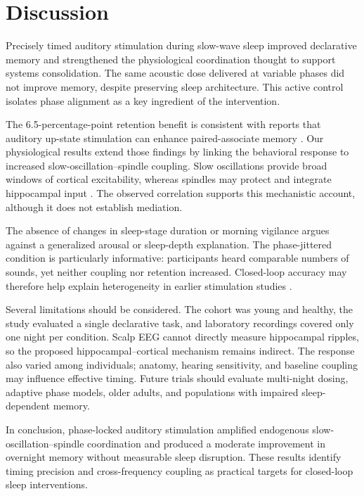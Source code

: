 \section{Discussion}

Precisely timed auditory stimulation during slow-wave sleep improved declarative memory and strengthened the physiological coordination thought to support systems consolidation. The same acoustic dose delivered at variable phases did not improve memory, despite preserving sleep architecture. This active control isolates phase alignment as a key ingredient of the intervention.

The 6.5-percentage-point retention benefit is consistent with reports that auditory up-state stimulation can enhance paired-associate memory \citep{Ngo2013}. Our physiological results extend those findings by linking the behavioral response to increased slow-oscillation--spindle coupling. Slow oscillations provide broad windows of cortical excitability, whereas spindles may protect and integrate hippocampal input \citep{Staresina2015}. The observed correlation supports this mechanistic account, although it does not establish mediation.

The absence of changes in sleep-stage duration or morning vigilance argues against a generalized arousal or sleep-depth explanation. The phase-jittered condition is particularly informative: participants heard comparable numbers of sounds, yet neither coupling nor retention increased. Closed-loop accuracy may therefore help explain heterogeneity in earlier stimulation studies \citep{Papalambros2017}.

Several limitations should be considered. The cohort was young and healthy, the study evaluated a single declarative task, and laboratory recordings covered only one night per condition. Scalp EEG cannot directly measure hippocampal ripples, so the proposed hippocampal--cortical mechanism remains indirect. The response also varied among individuals; anatomy, hearing sensitivity, and baseline coupling may influence effective timing. Future trials should evaluate multi-night dosing, adaptive phase models, older adults, and populations with impaired sleep-dependent memory.

In conclusion, phase-locked auditory stimulation amplified endogenous slow-oscillation--spindle coordination and produced a moderate improvement in overnight memory without measurable sleep disruption. These results identify timing precision and cross-frequency coupling as practical targets for closed-loop sleep interventions.

